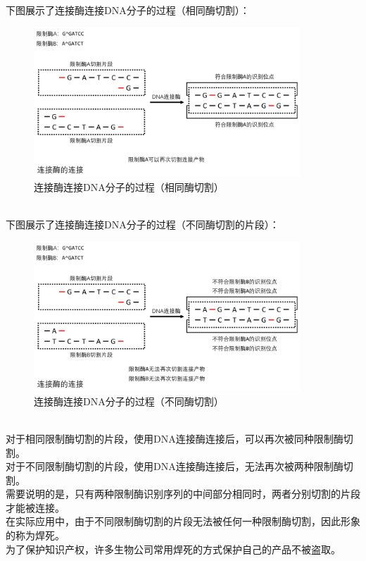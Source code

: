 \documentclass[UTF8]{ctexart}
\begin{document}
\newpage

    下图展示了连接酶连接DNA分子的过程（相同酶切割）：
    \begin{figure}[h]
        \begin{center}
            \includegraphics[width=10cm]{BiologyImage/64.jpg}
        \end{center}
        \caption{连接酶连接DNA分子的过程（相同酶切割）}
    \end{figure}\\[1mm]
    下图展示了连接酶连接DNA分子的过程（不同酶切割的片段）：
    \begin{figure}[h]
        \begin{center}
            \includegraphics[width=10cm]{BiologyImage/65.jpg}
        \end{center}
        \caption{连接酶连接DNA分子的过程（不同酶切割）}
    \end{figure}\\[2mm]
    对于相同限制酶切割的片段，使用DNA连接酶连接后，可以再次被同种限制酶切割。\\[3mm]
    对于不同限制酶切割的片段，使用DNA连接酶连接后，无法再次被两种限制酶切割。\\[6mm]
    需要说明的是，只有两种限制酶识别序列的中间部分相同时，两者分别切割的片段才能被连接。\\[3mm]
    在实际应用中，由于不同限制酶切割的片段无法被任何一种限制酶切割，因此形象的称为焊死。\\[3mm]
    为了保护知识产权，许多生物公司常用焊死的方式保护自己的产品不被盗取。
\end{document}
